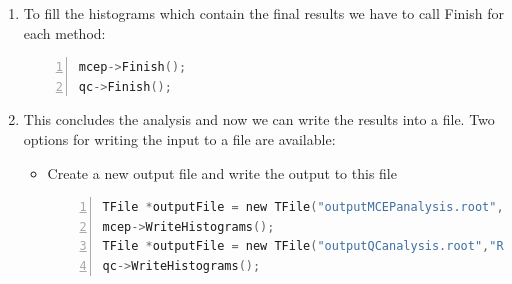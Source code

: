 \documentclass[a4paper]{book}
\numberwithin{equation}{subsection}
\begin{document}
\begin{enumerate}
	We do this in an event loop. First define the number of events that need to be created, their multiplicity, and a value $v_2$ value, which can either be supplied as a fixed number (no $p_t$ dependence) of a function (to generate $p_t$ differential flow\footnote{The on the fly event generator is not limited to the generation of the second harmonic $v_2$, but to get started, this is a nice example.}
	
	\begin{lstlisting}[language=C, numbers=left]
Int_t nEvents = 1000;	// generate 1000 events
Int_t mult = 2000;		// use track multiplicity of 2000
Double_t v2 = .05;		// 5 pct integrated flow
// or sample differential flow
TF1* diffv2 = new TF1("diffv2", "((x<1.)*(0.1/1.)*x+(x>=1.)*0.1)", 0., 20.); \end{lstlisting}
	
Now we have all the ingredients to our first flow analysis	
	
	\begin{lstlisting}[language=C, numbers=left]
for(Int_t i=0; i<nEvents; i++) { 
    // make an event with mult particles 
    AliFlowEventSimple* flowevent = AliFlowEventSimple(mult,AliFlowEventSimple::kGenerate);
    // modify the tracks adding the flow value v2
    flowevent->AddV2(diffv2);
    // select the particles for the reference flow
    flowevent->TagRP(cutsRP);
    // select the particles for differential flow
    flowevent->TagPOI(cutsPOI);
    // do flow analysis with various methods:
    mcep->Make(flowevent);
    qc->Make(flowevent);
    // delete the event from memory
    delete flowevent;
} \end{lstlisting}
	\item To fill the histograms which contain the final results we have to call Finish for each method:
	\begin{lstlisting}[language=C, numbers=left]
mcep->Finish(); 
qc->Finish(); \end{lstlisting}
	\item This concludes the analysis and now we can write the results into a file. Two options for writing the input to a file are available: 
     \begin{itemize}
     \item Create a new output file and write the output to this file
     \begin{lstlisting}[language=C, numbers=left]
TFile *outputFile = new TFile("outputMCEPanalysis.root","RECREATE");
mcep->WriteHistograms();
TFile *outputFile = new TFile("outputQCanalysis.root","RECREATE");
qc->WriteHistograms();\end{lstlisting}


\end{itemize}
\end{enumerate}
\end{document}
